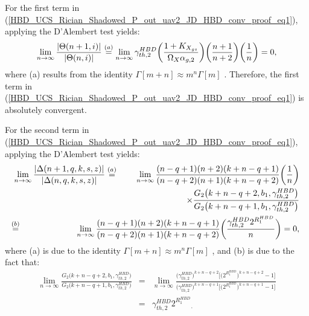 For the first term in (\ref{HBD_UCS_Rician_Shadowed_P_out_uav2_JD_HBD_conv_proof_eq1}), applying the D'Alembert test yields:
\begin{eqnarray}
 \lim_{n \to \infty} \frac{|\Theta(n+1,i)|}{|\Theta(n,i)|} \stackrel{(a)}{=} \lim_{n \to \infty} \gamma_{th,2}^{HBD} \bigg(\frac{1+K_{X_{gs}}}{\Omega_X\alpha_{g,2}}\bigg) \bigg(\frac{n+1}{n+2}\bigg) \bigg(\frac{1}{n}\bigg) = 0,
\end{eqnarray}
where (a) results from the identity $\Gamma[m+n] \approx m^n\Gamma[m]$ \cite[eq. (25)]{rached2017unified}. Therefore, the first term in (\ref{HBD_UCS_Rician_Shadowed_P_out_uav2_JD_HBD_conv_proof_eq1}) is absolutely convergent.

For the second term in (\ref{HBD_UCS_Rician_Shadowed_P_out_uav2_JD_HBD_conv_proof_eq1}), applying the D'Alembert test yields:
\begin{eqnarray}
\lim_{n \to \infty} \frac{|\Delta(n+1,q,k,s,z)|}{|\Delta(n,q,k,s,z)|} & \eqa & \lim_{n \to \infty} \frac{(n-q+1)(n+2)(k+n-q+1)}{(n-q+2)(n+1)(k+n-q+2)}\bigg(\frac{1}{n}\bigg) \nonumber \\
 & & \hspace{1cm} \times \frac{G_2\big(k+n-q+2,b_1,\gamma_{th,2}^{HBD}\big)}{G_2\big(k+n-q+1,b_1,\gamma_{th,2}^{HBD}\big)} \nonumber \\
 & \hspace{-4cm} \eqb & \hspace{-2cm} \lim_{n \to \infty} \frac{(n-q+1)(n+2)(k+n-q+1)}{(n-q+2)(n+1)(k+n-q+2)} \bigg(\frac{\gamma_{th,2}^{HBD} 2^{R_1^{HBD}}}{n}\bigg) = 0, \label{HBD_UCS_Rician_Shadowed_P_out_uav2_JD_HBD_conv_proof_eq2}
\end{eqnarray}
where (a) is due to the identity $\Gamma[m+n] \approx m^n\Gamma[m]$ \cite[eq. (25)]{rached2017unified}, and (b) is due to the fact that:
\begin{eqnarray}
\lim_{n \to \infty} \frac{G_2\big(k+n-q+2,b_1,\gamma_{th,2}^{HBD}\big)}{G_2\big(k+n-q+1,b_1,\gamma_{th,2}^{HBD}\big)} & = & \lim_{n \to \infty} \frac{\big(\gamma_{th,2}^{HBD}\big)^{k+n-q+2} \big[ \big( 2^{R_1^{HBD}}\big)^{k+n-q+2} - 1 \big]}{\big(\gamma_{th,2}^{HBD}\big)^{k+n-q+1} \big[ \big( 2^{R_1^{HBD}}\big)^{k+n-q+1} - 1 \big]} \nonumber \\
 & = &  \gamma_{th,2}^{HBD} { 2^{R_1^{HBD}} }_.
\end{eqnarray}

